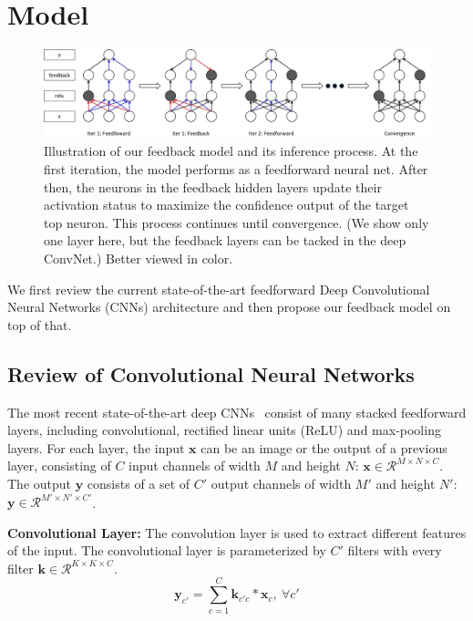 \section{Model}
\label{sec:model}

\setlength{\tabcolsep}{2pt}
\begin{figure}
\begin{center}
\includegraphics[width=0.95\linewidth]{figs/model/model}
\caption{Illustration of our feedback model and its inference process. At the first iteration, the model performs as a feedforward neural net. After then, the neurons in the feedback hidden layers update their activation status to maximize the confidence output of the target top neuron. This process continues until convergence. (We show only one layer here, but the feedback layers can be tacked in the deep ConvNet.) Better viewed in color.}
\label{fig:model}
\end{center}
\end{figure}

We first review the current state-of-the-art feedforward Deep Convolutional Neural Networks (CNNs) architecture and then propose our feedback model on top of that.

\subsection{Review of Convolutional Neural Networks}
The most recent state-of-the-art deep CNNs~\cite{Simonyan2014Very} consist of many stacked feedforward layers, including convolutional, rectified linear units (ReLU) and max-pooling layers. For each layer, the input $\mathbf{x}$ can be an image or the output of a previous layer, consisting of $C$ input channels of width $M$ and height $N$: $\mathbf{x} \in \mathcal{R}^{M \times N \times C}$. The output $\mathbf{y}$ consists of a set of $C'$ output channels of width $M'$ and height $N'$: $\mathbf{y} \in \mathcal{R}^{M' \times N' \times C'}$.

\textbf{Convolutional Layer:}
The convolution layer is used to extract different features of the input. The convolutional layer is parameterized by $C'$ filters with every filter $\mathbf{k} \in \mathcal{R}^{K \times K \times C}$.
\begin{equation}
\mathbf{y}_{c'} = \sum_{c=1}^C \mathbf{k}_{c'c} * \mathbf{x}_c,\ \forall c'
\end{equation}

